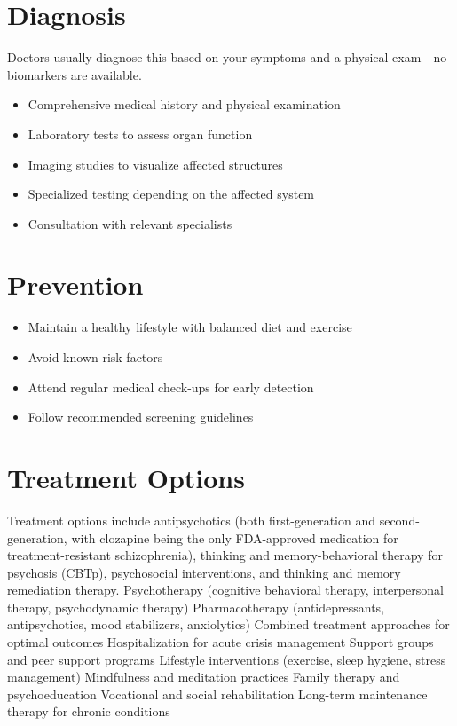 \section{Diagnosis}
Doctors usually diagnose this based on your symptoms and a physical exam---no biomarkers are available.

\begin{itemize}[noitemsep]
  \item Comprehensive medical history and physical examination
  \item Laboratory tests to assess organ function
  \item Imaging studies to visualize affected structures
  \item Specialized testing depending on the affected system
  \item Consultation with relevant specialists
\end{itemize}
\section{Prevention}
\begin{itemize}[noitemsep]
  \item Maintain a healthy lifestyle with balanced diet and exercise
  \item Avoid known risk factors
  \item Attend regular medical check-ups for early detection
  \item Follow recommended screening guidelines
\end{itemize}
\section{Treatment Options}
Treatment options include antipsychotics (both first-generation and second-generation, with clozapine being the only FDA-approved medication for treatment-resistant schizophrenia), thinking and memory-behavioral therapy for psychosis (CBTp), psychosocial interventions, and thinking and memory remediation therapy. Psychotherapy (cognitive behavioral therapy, interpersonal therapy, psychodynamic therapy) Pharmacotherapy (antidepressants, antipsychotics, mood stabilizers, anxiolytics) Combined treatment approaches for optimal outcomes Hospitalization for acute crisis management Support groups and peer support programs Lifestyle interventions (exercise, sleep hygiene, stress management) Mindfulness and meditation practices Family therapy and psychoeducation Vocational and social rehabilitation Long-term maintenance therapy for chronic conditions


